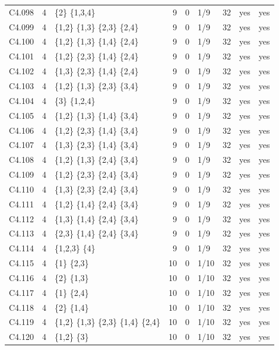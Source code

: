 {\begin{longtable}{@{}llp{6.2cm}rllrll@{}}
C4.098 & 4 & \{2\} \{1,3,4\} & 9 & 0 & 1/9 & 32 & yes & yes \\
C4.099 & 4 & \{1,2\} \{1,3\} \{2,3\} \{2,4\} & 9 & 0 & 1/9 & 32 & yes & yes \\
C4.100 & 4 & \{1,2\} \{1,3\} \{1,4\} \{2,4\} & 9 & 0 & 1/9 & 32 & yes & yes \\
C4.101 & 4 & \{1,2\} \{2,3\} \{1,4\} \{2,4\} & 9 & 0 & 1/9 & 32 & yes & yes \\
C4.102 & 4 & \{1,3\} \{2,3\} \{1,4\} \{2,4\} & 9 & 0 & 1/9 & 32 & yes & yes \\
C4.103 & 4 & \{1,2\} \{1,3\} \{2,3\} \{3,4\} & 9 & 0 & 1/9 & 32 & yes & yes \\
C4.104 & 4 & \{3\} \{1,2,4\} & 9 & 0 & 1/9 & 32 & yes & yes \\
C4.105 & 4 & \{1,2\} \{1,3\} \{1,4\} \{3,4\} & 9 & 0 & 1/9 & 32 & yes & yes \\
C4.106 & 4 & \{1,2\} \{2,3\} \{1,4\} \{3,4\} & 9 & 0 & 1/9 & 32 & yes & yes \\
C4.107 & 4 & \{1,3\} \{2,3\} \{1,4\} \{3,4\} & 9 & 0 & 1/9 & 32 & yes & yes \\
C4.108 & 4 & \{1,2\} \{1,3\} \{2,4\} \{3,4\} & 9 & 0 & 1/9 & 32 & yes & yes \\
C4.109 & 4 & \{1,2\} \{2,3\} \{2,4\} \{3,4\} & 9 & 0 & 1/9 & 32 & yes & yes \\
C4.110 & 4 & \{1,3\} \{2,3\} \{2,4\} \{3,4\} & 9 & 0 & 1/9 & 32 & yes & yes \\
C4.111 & 4 & \{1,2\} \{1,4\} \{2,4\} \{3,4\} & 9 & 0 & 1/9 & 32 & yes & yes \\
C4.112 & 4 & \{1,3\} \{1,4\} \{2,4\} \{3,4\} & 9 & 0 & 1/9 & 32 & yes & yes \\
C4.113 & 4 & \{2,3\} \{1,4\} \{2,4\} \{3,4\} & 9 & 0 & 1/9 & 32 & yes & yes \\
C4.114 & 4 & \{1,2,3\} \{4\} & 9 & 0 & 1/9 & 32 & yes & yes \\
C4.115 & 4 & \{1\} \{2,3\} & 10 & 0 & 1/10 & 32 & yes & yes \\
C4.116 & 4 & \{2\} \{1,3\} & 10 & 0 & 1/10 & 32 & yes & yes \\
C4.117 & 4 & \{1\} \{2,4\} & 10 & 0 & 1/10 & 32 & yes & yes \\
C4.118 & 4 & \{2\} \{1,4\} & 10 & 0 & 1/10 & 32 & yes & yes \\
C4.119 & 4 & \{1,2\} \{1,3\} \{2,3\} \{1,4\} \{2,4\} & 10 & 0 & 1/10 & 32 & yes & yes \\
C4.120 & 4 & \{1,2\} \{3\} & 10 & 0 & 1/10 & 32 & yes & yes \\

\end{longtable}}
